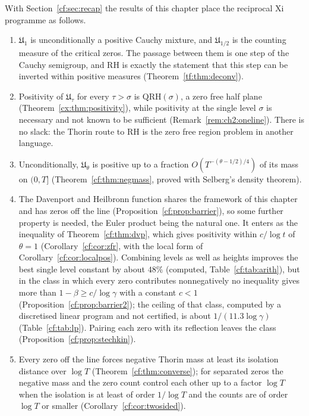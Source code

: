 With Section~\ref{cf:sec:recap} the results of this chapter place the reciprocal Xi programme as follows.
\begin{enumerate}
\item $\mathfrak U_1$ is unconditionally a positive Cauchy mixture, and $\mathfrak U_{1/2}$ is the counting measure of the critical zeros. The passage between them is one step of the Cauchy semigroup, and RH is exactly the statement that this step can be inverted within positive measures (Theorem~\ref{tf:thm:deconv}).
\item Positivity of $\mathfrak U_\tau$ for every $\tau>\sigma$ is $\mathrm{QRH}(\sigma)$, a zero free half plane (Theorem~\ref{cx:thm:positivity}), while positivity at the single level $\sigma$ is necessary and not known to be sufficient (Remark~\ref{rem:ch2:oneline}). There is no slack: the Thorin route to RH is the zero free region problem in another language.
\item Unconditionally, $\mathfrak U_\theta$ is positive up to a fraction $O(T^{-(\theta-1/2)/4})$ of its mass on $(0,T]$ (Theorem~\ref{cf:thm:negmass}, proved with Selberg's density theorem).
\item The Davenport and Heilbronn function shares the framework of this chapter and has zeros off the line (Proposition~\ref{cf:prop:barrier}), so some further property is needed, the Euler product being the natural one. It enters as the inequality of Theorem~\ref{cf:thm:dvp}, which gives positivity within $c/\log t$ of $\theta=1$ (Corollary~\ref{cf:cor:zfr}, with the local form of Corollary~\ref{cf:cor:localpos}). Combining levels as well as heights improves the best single level constant by about $48\%$ (computed, Table~\ref{cf:tab:arith}), but in the class in which every zero contributes nonnegatively no inequality gives more than $1-\beta\ge c/\log\gamma$ with a constant $c<1$ (Proposition~\ref{cf:prop:barrier2}); the ceiling of that class, computed by a discretised linear program and not certified, is about $1/(11.3\log\gamma)$ (Table~\ref{cf:tab:lp}). Pairing each zero with its reflection leaves the class (Proposition~\ref{cf:prop:stechkin}).
\item Every zero off the line forces negative Thorin mass at least its isolation distance over $\log T$ (Theorem~\ref{cf:thm:converse}); for separated zeros the negative mass and the zero count control each other up to a factor $\log T$ when the isolation is at least of order $1/\log T$ and the counts are of order $\log T$ or smaller (Corollary~\ref{cf:cor:twosided}).
\end{enumerate}

